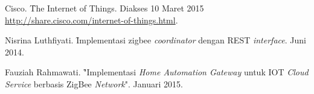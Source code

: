 %
% 

% 
% 
\begin{thebibliography}{10}

{Cisco. \f{The Internet of Things}.
Diakses 10 Maret 2015 \url{http://share.cisco.com/internet-of-things.html}.}

{Nisrina Luthfiyati. \f{Implementasi zigbee \textit{coordinator} dengan REST \textit{interface}}.
Juni 2014.}

{Fauziah Rahmawati. \f{"Implementasi \textit{Home Automation Gateway} untuk IOT \textit{Cloud Service} berbasis ZigBee \textit{Network}"}.
Januari 2015.}

\end{thebibliography}

